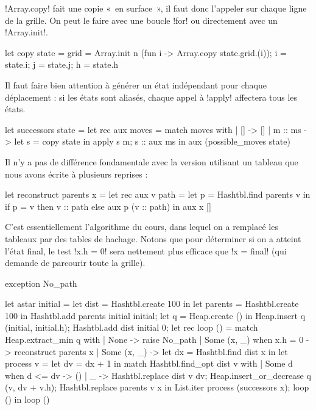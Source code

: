 \begin{ques}
  \ml!Array.copy! fait une copie «~en surface~», il faut donc l'appeler
  sur chaque ligne de la grille. On peut le faire avec une boucle \ml!for!
  ou directement avec un \ml!Array.init!.
\begin{ocaml}
let copy state =
  {grid = Array.init n (fun i -> Array.copy state.grid.(i));
   i = state.i;
   j = state.j;
   h = state.h}
\end{ocaml}
\end{ques}

\begin{ques}
  Il faut faire bien attention à générer un état indépendant pour
  chaque déplacement : si les états sont aliasés, chaque appel
  à \ml!apply! affectera tous les états.
\begin{ocaml}
let successors state =
  let rec aux moves =
    match moves with
    | [] -> []
    | m :: ms ->
      let s = copy state in
      apply s m;
      s :: aux ms in
  aux (possible_moves state)
\end{ocaml}
\end{ques}

\begin{ques}
  Il n'y a pas de différence fondamentale avec la version utilisant
  un tableau que nous avons écrite à plusieurs reprises :
\begin{ocaml}
let reconstruct parents x =
  let rec aux v path =
    let p = Hashtbl.find parents v in
    if p = v then v :: path
    else aux p (v :: path) in
  aux x []
\end{ocaml}
\end{ques}

\begin{ques}
  C'est essentiellement l'algorithme du cours, dans lequel
  on a remplacé les tableaux par des tables de hachage.
  Notons que pour déterminer si on a atteint l'état final,
  le test \ml!x.h = 0! sera nettement plus efficace que
  \ml!x = final! (qui demande de parcourir toute la grille).
\begin{ocaml}
exception No_path

let astar initial =
  let dist = Hashtbl.create 100 in
  let parents = Hashtbl.create 100 in
  Hashtbl.add parents initial initial;
  let q = Heap.create () in
  Heap.insert q (initial, initial.h);
  Hashtbl.add dist initial 0;
  let rec loop () =
    match Heap.extract_min q with
    | None -> raise No_path
    | Some (x, _) when x.h = 0 -> reconstruct parents x
    | Some (x, _) ->
      let dx = Hashtbl.find dist x in
      let process v =
        let dv = dx + 1 in
        match Hashtbl.find_opt dist v with
        | Some d when d <= dv -> ()
        | _ ->
          Hashtbl.replace dist v dv;
          Heap.insert_or_decrease q (v, dv + v.h);
          Hashtbl.replace parents v x in
      List.iter process (successors x);
      loop () in
  loop ()
\end{ocaml}
\end{ques}

